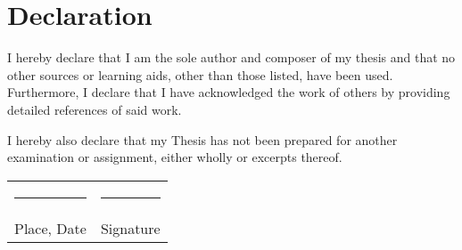 \chapter*{Declaration}

I hereby declare that I am the sole author and composer of my thesis and that no other sources or learning aids, other than those listed, have been used. Furthermore, I declare that I have acknowledged the work of others by providing detailed references of said work.

I hereby also declare that my Thesis has not been prepared for another examination or assignment, either wholly or excerpts thereof.

\vspace{3\normalbaselineskip}

\begin{tabular}{p{} p{}}
    \rule{0.33\textwidth}{0.4pt} & \rule{0.33\textwidth}{0.4pt} \\
    Place, Date                  & Signature
\end{tabular}
